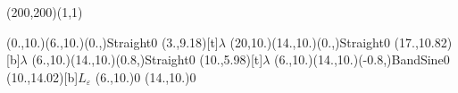 \unitlength=1bp%

\begin{feynartspicture}(200,200)(1,1)

\FADiagram{}
\FAProp(0.,10.)(6.,10.)(0.,){Straight}{0}
\FALabel(3.,9.18)[t]{$\lambda$}
\FAProp(20,10.)(14.,10.)(0.,){Straight}{0}
\FALabel(17.,10.82)[b]{$\lambda$}
\FAProp(6.,10.)(14.,10.)(0.8,){Straight}{0}
\FALabel(10.,5.98)[t]{$\lambda$}
\FAProp(6.,10.)(14.,10.)(-0.8,){BandSine}{0}
\FALabel(10.,14.02)[b]{$L_\varepsilon$}
\FAVert(6.,10.){0}
\FAVert(14.,10.){0}
\end{feynartspicture}

